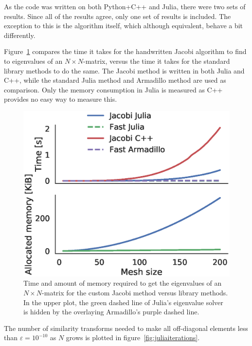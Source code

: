 \documentclass[aps,reprint]{revtex4-1}
\begin{document}
As the code was written on both Python+C++ and Julia, there were two sets of
results. Since all of the results agree, only one set of results is included.
The exception to this is the algorithm itself, which although equivalent, behave
a bit differently.

Figure~\ref{fig:juliatiming} compares the time it takes for the handwritten
Jacobi algorithm to find to eigenvalues of an \(N\times N\)-matrix, versus the
time it takes for the standard library methods to do the same. The Jacobi method
is written in both Julia and C++, while the standard Julia method and Armadillo
method are used as comparison. Only the memory consumption in Julia is measured
as C++ provides no easy way to measure this.

\begin{figure}[ht]
  \centering
  \includegraphics[width=\columnwidth]{figures/juliatime.eps}
  \caption{\label{fig:juliatiming} Time and amount of memory required to get the eigenvalues of an
    \(N\times N\)-matrix for the custom Jacobi method versus library methods. In
  the upper plot, the green dashed line of Julia's eigenvalue solver is hidden
  by the overlaying Armadillo's purple dashed line.}
\end{figure}

The number of similarity transforms needed to make all off-diagonal elements
less than \(\varepsilon=10^{-10}\) as \(N\) grows is plotted in
figure~\ref{fig:juliaiterations}.
\end{document}
